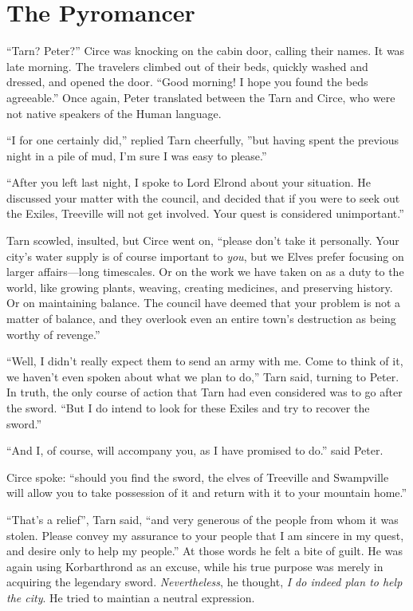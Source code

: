 \chapter{The Pyromancer}

``Tarn?  Peter?''  Circe was knocking on the cabin door, calling their names.  It was late morning.  The travelers climbed out of their beds, quickly washed and dressed, and opened the door.  ``Good morning!  I hope you found the beds agreeable.''  Once again, Peter translated between the Tarn and Circe, who were not native speakers of the Human language.

``I for one certainly did,'' replied Tarn cheerfully, ''but having spent the previous night in a pile of mud, I'm sure I was easy to please.''

``After you left last night, I spoke to Lord Elrond about your situation.  He discussed your matter with the council, and decided that if you were to seek out the Exiles, Treeville will not get involved.  Your quest is considered unimportant.''

Tarn scowled, insulted, but Circe went on, ``please don't take it personally.  Your city's water supply is of course important to \emph{you}, but we Elves prefer focusing on larger affairs---long timescales.  Or on the work we have taken on as a duty to the world, like growing plants, weaving, creating medicines, and preserving history.  Or on maintaining balance.  The council have deemed that your problem is not a matter of balance, and they overlook even an entire town's destruction as being worthy of revenge.''

``Well, I didn't really expect them to send an army with me.  Come to think of it, we haven't even spoken about what we plan to do,'' Tarn said, turning to Peter.  In truth, the only course of action that Tarn had even considered was to go after the sword.  ``But I do intend to look for these Exiles and try to recover the sword.''

``And I, of course, will accompany you, as I have promised to do.'' said Peter.

Circe spoke: ``should you find the sword, the elves of Treeville and Swampville will allow you to take possession of it and return with it to your mountain home.''

``That's a relief'', Tarn said, ``and very generous of the people from whom it was stolen.  Please convey my assurance to your people that I am sincere in my quest, and desire only to help my people.''  At those words he felt a bite of guilt.  He was again using Korbarthrond as an excuse, while his true purpose was merely in acquiring the legendary sword.  \emph{Nevertheless}, he thought, \emph{I do indeed plan to help the city}.  He tried to maintian a neutral expression.


